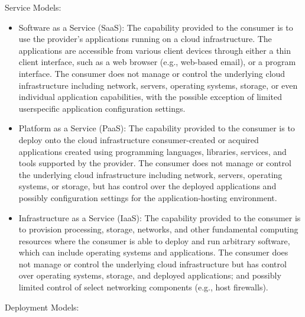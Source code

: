 Service Models:
\begin{itemize}
	\item Software as a Service (SaaS): The capability provided to the consumer is to use the provider’s applications running on a cloud infrastructure. The applications are accessible from various client devices through either a thin client interface, such as a web browser (e.g.,	web-based email), or a program interface. The consumer does not manage or control the	underlying cloud infrastructure including network, servers, operating systems, storage, or even individual application capabilities, with the possible exception of limited userspecific application configuration settings.
	\item Platform as a Service (PaaS): The capability provided to the consumer is to deploy onto the cloud	infrastructure consumer-created or acquired applications created using programming languages, libraries, services, and tools supported by the provider. The consumer does not manage or control the underlying cloud infrastructure including network, servers, operating systems, or storage, but has control over the deployed applications and possibly configuration settings for the application-hosting environment.
	\item Infrastructure as a Service (IaaS): The capability provided to the consumer is to provision	processing, storage, networks, and other fundamental computing resources where the consumer is able to deploy and run arbitrary software, which can include operating systems and applications. The consumer does not manage or control the underlying cloud infrastructure but has control over operating systems, storage, and deployed applications;	and possibly limited control of select networking components (e.g., host firewalls).
\end{itemize}

Deployment Models:

